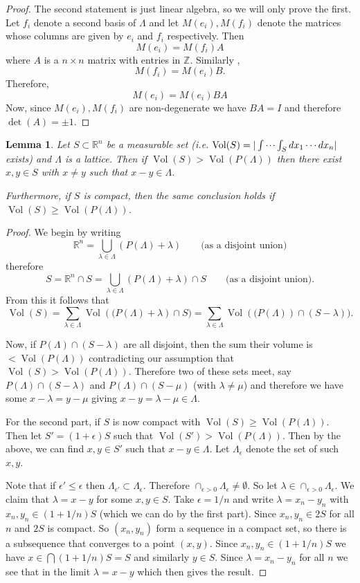 \documentclass[11pt,a4paper]{report}
\theoremstyle{plain}
\newtheorem{lemma}[subsection]{Lemma}
\theoremstyle{definition}
\theoremstyle{definition}
\newcommand{\ZZ}{\mathbb{Z}}
\newcommand{\RR}{\mathbb{R}}
\def \e {\epsilon}
\def \lam {\lambda}
\DeclareMathOperator{\Vol}{Vol}
\begin{document}
	\begin{proof}
		The second statement is just linear algebra, so we will only prove the first. Let $f_i$ denote a second basis of $\Lambda$ and let $M(e_i), M(f_i)$ denote the matrices whose columns are given by $e_i$ and $f_i$ respectively.  Then \[M(e_i)=M(f_i)A\] where $A$ is a $n \times n$ matrix with entries in $\ZZ$. Similarly , \[M(f_i)=M(e_i)B.\] Therefore, \[M(e_i)=M(e_i)BA\]  Now, since $M(e_i),M(f_i)$ are non-degenerate we have $BA=I$ and therefore $\det(A)=\pm 1$.
	\end{proof}
	
	\begin{lemma}\label{lem: subset of Rn diff lemma}
		Let $S \subset \RR^n$ be a measurable set (i.e. $\Vol(S)=|\idotsint_S dx_1\cdots dx_n|$ exists) and $\Lambda$ is a lattice. Then if\/ $\Vol(S) > \Vol(P(\Lambda))$ then there exist $x,y \in S$ with $x \neq y$ such that $x-y \in \Lambda$.
		
		Furthermore, if $S$ is compact, then the same conclusion holds if $\Vol(S) \geq \Vol(P(\Lambda))$.
	\end{lemma}
	
	\begin{proof}
		We begin by writing \[\RR^n = \bigcup_{\lam \in \Lambda}  \left (P(\Lambda)+\lam \right )\qquad \text{(as a disjoint union)}\] therefore \[S= \RR^n \cap S= \bigcup_{\lam \in \Lambda}  \left (P(\Lambda)+\lam \right ) \cap S \qquad \text{(as a disjoint union)}. \] From this it follows that \[\Vol(S)=\sum_{\lam \in \Lambda}  \Vol \left ((P(\Lambda)+\lam \right ) \cap S) =\sum_{\lam \in \Lambda}  \Vol  \left ((P(\Lambda) \right ) \cap (S-\lam) ).  \]
		
		Now, if $P(\Lambda) \cap (S -\lam)$ are all disjoint, then the sum their volume is $< \Vol(P(\Lambda))$ contradicting  our assumption that $\Vol(S)> \Vol(P(\Lambda))$. Therefore two of these sets meet, say $P(\Lambda) \cap (S -\lam)$ and $P(\Lambda) \cap (S -\mu)$ (with $\lam \neq \mu$) and therefore we have some $x-\lam=y-\mu$ giving $x-y=\lam-\mu \in \Lambda$.
		
		
		For the second part, if $S$ is now compact with $\Vol(S) \geq \Vol(P(\Lambda))$. Then let $S'=(1+\e)S$ such that $\Vol(S')> \Vol(P(\Lambda))$. Then by the above, we can find $x,y \in S'$ such that $x-y \in \Lambda$. Let $\Lambda_\e$ denote the set of such $x,y$.
		
		Note that if $\e' \leq \e$ then $\Lambda_{\e'} \subset \Lambda_\e$. Therefore $\cap_{\e>0} \Lambda_\e \neq \emptyset$. So let $\lam \in \cap_{\e>0} \Lambda_\e$. We claim that $\lam=x-y$ for some $x,y \in S$. Take $\e=1/n$ and write $\lam=x_n-y_n$ with $x_n,y_n \in (1+1/n)S$ (which we can do by the first part). Since $x_n,y_n \in 2S$ for all $n$ and $2S$ is compact. So $(x_n,y_n)$ form a sequence in a compact set, so there is a subsequence that converges to a point $(x,y)$. Since $x_n,y_n \in (1+1/n)S$ we have $x \in \bigcap(1+1/n)S=S$ and similarly $y \in S$. Since $\lam=x_n-y_n$ for all $n$ we see that in the limit $\lam=x-y$ which then gives the result.
		
	\end{proof}
	
\end{document}
